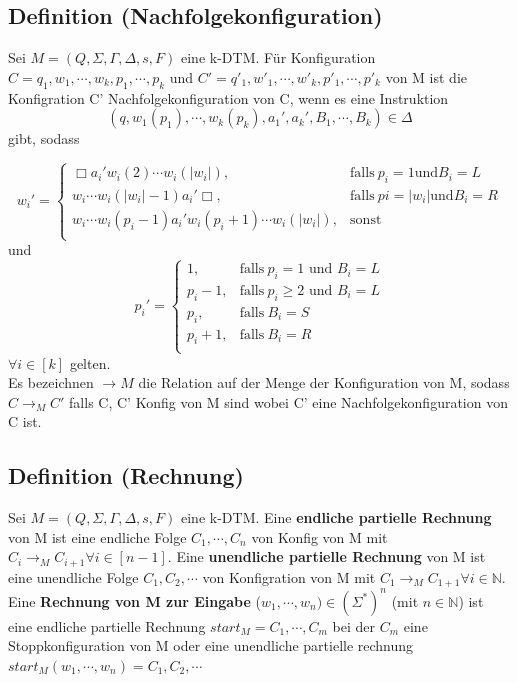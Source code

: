 \subsection{Definition (Nachfolgekonfiguration)} 
\begin{sloppypar}
  Sei $M = (Q, \Sigma, \Gamma, \Delta, s, F)$ eine k-DTM. Für Konfiguration $C = q_{1}, w_{1}, \cdots, w_{k}, p_{1},\cdots, p_{k}$ und $C' = q'_{1}, w'_{1}, \cdots, w'_{k}, p'_{1},\cdots, p'_{k}$ von M ist die Konfigration C' Nachfolgekonfiguration von C, wenn es eine Instruktion \[(q, w_{1}(p_{1}), \cdots, w_{k}(p_{k}), a_{1}', a_{k}', B_{1}, \cdots, B_{k}) \in \Delta\] gibt, sodass 
\end{sloppypar}
\begin{equation*}
  w_{i}' = 
  \begin{cases}
    \Box a_{i}' w_{i}(2) \cdots w_{i}(|w_{i}|), & \text{falls}\ p_{i} = 1 \text{und}  B_{i} = L \\
    w_{i} \cdots w_{i}(|w_{i}| - 1) a_{i}' \Box, & \text{falls}\ p{i} = |w_{i}| \text{und} B_{i} = R \\
    w_{i} \cdots w_{i}(p_{i}-1) a_{i}' w_{i}(p_{i} + 1) \cdots w_{i}(|w_{i}|), & \text{sonst} \\
  \end{cases}
\end{equation*}
und 
\begin{equation*}
  p_{i}' = 
  \begin{cases}
    1, & \text{falls}\ p_{i} = 1 \text{ und } B_{i} = L\\
    p_{i} - 1, & \text{falls}\ p_{i} \geq 2 \text{ und } B_{i} = L\\
    p_{i}, & \text{falls}\ B_{i} = S\\
    p_{i} + 1, & \text{falls}\ B_{i} = R\\
  \end{cases}
\end{equation*}
$\forall i \in [k]$ gelten. \\ Es bezeichnen $\rightarrow M$ die Relation auf der Menge der Konfiguration von M, sodass $C \rightarrow_{M} C'$ falls C, C' Konfig von M sind wobei C' eine Nachfolgekonfiguration von C ist.

\subsection{Definition (Rechnung)} Sei $M = (Q, \Sigma, \Gamma, \Delta, s, F)$ eine k-DTM. Eine \textbf{endliche partielle Rechnung} von M ist eine endliche Folge $C_{1}, \cdots, C_{n}$ von Konfig von M mit $C_{i} \rightarrow_{M} C_{i+1} \forall i \in [n-1]$. Eine \textbf{unendliche partielle Rechnung} von M ist eine unendliche Folge $C_{1}, C_{2}, \cdots$ von Konfigration von M mit $C_{1} \rightarrow_{M} C_{1+1} \forall i \in \mathbb{N}$. Eine \textbf{Rechnung von M zur Eingabe } ($w_{1}, \cdots
, w_{n}) \in (\Sigma^*)^n$ (mit $n \in \mathbb{N}$) ist eine endliche partielle Rechnung $start_M = C_1, \cdots, C_m$ bei der $C_m$ eine Stoppkonfiguration von M oder eine unendliche partielle rechnung $start_M(w_1, \cdots, w_n) = C_1, C_2, \cdots$

